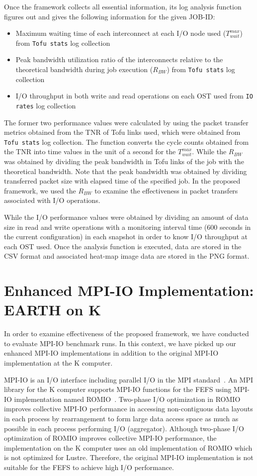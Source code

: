 \documentclass{jhps}
\begin{document}
Once the framework collects all essential information, its log analysis function
figures out and gives the following information for the given JOB-ID:
\begin{itemize}
\item Maximum waiting time of each interconnect at each I/O node used ($T_{wait}^{max}$)
from {\tt Tofu stats} log collection
\item Peak bandwidth utilization ratio of the interconnects relative to
the theoretical bandwidth during job execution ($R_{BW}$)
from {\tt Tofu stats} log collection
\item I/O throughput in both write and read operations on each OST used
from {\tt IO rates} log collection
\end{itemize}
%
The former two performance values were calculated by using the packet transfer metrics
obtained from the TNR of Tofu links used, which were obtained from
{\tt Tofu stats} log collection.
The function converts the cycle counts obtained from the TNR
into time values in the unit of a second for the $T_{wait}^{max}$.
While the $R_{BW}$ was obtained by dividing the peak bandwidth
in Tofu links of the job with the theoretical bandwidth.
Note that the peak bandwidth was obtained by dividing transferred packet size
with elapsed time of the specified job.
In the proposed framework, we used the $R_{BW}$
to examine the effectiveness in packet transfers associated with I/O operations.

While the I/O performance values were obtained by dividing an amount of data size
in read and write operations with a monitoring interval time
(600 seconds in the current configuration) in each snapshot
in order to know I/O throughput at each OST used.
Once the analysis function is executed, data are stored in the CSV format
and associated heat-map image data are stored in the PNG format.

\section{Enhanced MPI-IO Implementation: EARTH on K}
\label{sec:EARTH}

In order to examine effectiveness of the proposed framework,
we have conducted to evaluate MPI-IO benchmark runs.
In this context, we have picked up our enhanced MPI-IO implementations
in addition to the original MPI-IO implementation at the K computer.

MPI-IO is an I/O interface including parallel I/O in the MPI standard~\cite{mpi-forum:web}.
An MPI library for the K computer supports MPI-IO functions for the FEFS
using MPI-IO implementation named ROMIO~\cite{thakur:romio}.
Two-phase I/O optimization in ROMIO
improves collective MPI-IO performance in accessing
non-contiguous data layouts in each process by rearrangement
to form large data access space as much as possible in each process
performing I/O (aggregator).
Although two-phase I/O optimization of ROMIO improves collective MPI-IO performance,
the implementation on the K computer uses an old implementation of ROMIO
which is not optimized for Lustre.
Therefore, the original MPI-IO implementation is not suitable
for the FEFS to achieve high I/O performance.
\end{document}
